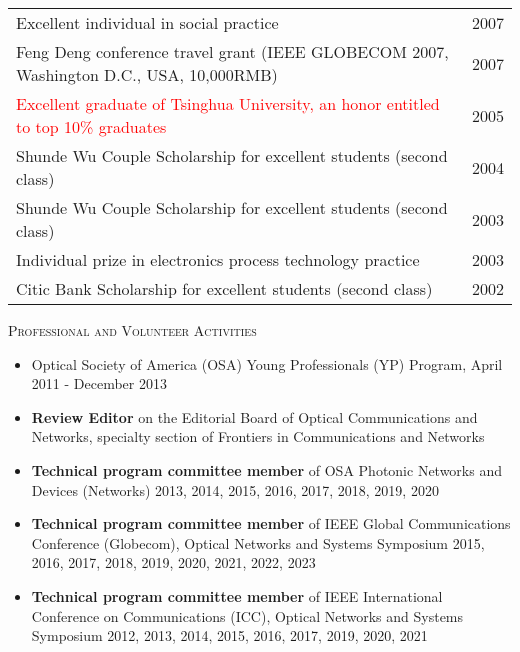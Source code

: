 \documentclass[letterpaper,11pt]{article}
\newcommand{\resheading}[1]{{\noindent\large \colorbox{mygrey}{
\begin{minipage}{1.0\textwidth}{\textsc{#1 \vphantom{p\^{E}}}}\end{minipage}}}}
\begin{document}
\begin{CJK}{UTF8}{gbsn}
\begin{tabular*}{7.08in}{l@{\extracolsep{\fill}}r}
Excellent individual in social practice & 2007\\
Feng Deng conference travel grant (IEEE GLOBECOM 2007, Washington D.C., USA, 10,000RMB) & 2007\\
\textcolor{Red}{Excellent graduate of Tsinghua University, an honor entitled to top 10\% graduates} & 2005\\
Shunde Wu Couple Scholarship for excellent students (second class) & 2004\\
Shunde Wu Couple Scholarship for excellent students (second class) & 2003\\
Individual prize in electronics process technology practice & 2003\\
Citic Bank Scholarship for excellent students (second class) & 2002\\
\end{tabular*}




\leftskip 0.0cm
\vspace{0.1in}
\resheading{Professional and Volunteer Activities}%
\begin{itemize}
\setlength{\itemindent}{-0.075in}


\item
Optical Society of America (OSA) Young Professionals (YP) Program, April 2011 - December 2013

\item
\textbf{Review Editor} on the Editorial Board of Optical Communications and Networks, specialty section of Frontiers in Communications and Networks

\item
\textbf{Technical program committee member} of OSA Photonic Networks and Devices (Networks) 2013, 2014, 2015, 2016, 2017, 2018, 2019, 2020

\item
\textbf{Technical program committee member} of IEEE Global Communications Conference (Globecom), Optical Networks and Systems Symposium 2015, 2016, 2017,
2018, 2019, 2020, 2021, 2022, 2023

\item
\textbf{Technical program committee member} of IEEE International Conference on Communications (ICC), Optical Networks and Systems Symposium
2012, 2013, 2014, 2015, 2016, 2017, 2019, 2020, 2021


\end{itemize}
\end{CJK}
\end{document}
